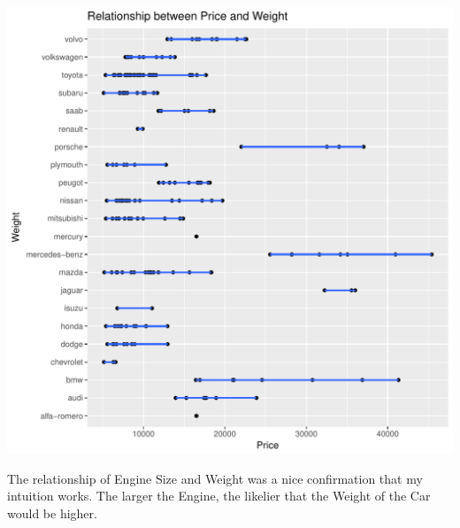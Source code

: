 \documentclass{article}\usepackage[]{graphicx}\usepackage[]{color}
\makeatletter
\def\maxwidth{ %
  \ifdim\Gin@nat@width>\linewidth
    \linewidth
  \else
    \Gin@nat@width
  \fi
}
\newenvironment{kframe}{%
 \def\at@end@of@kframe{}%
 \ifinner\ifhmode%
  \def\at@end@of@kframe{\end{minipage}}%
  \begin{minipage}{\columnwidth}%
 \fi\fi%
 \def\FrameCommand##1{\hskip\@totalleftmargin \hskip-\fboxsep
 \colorbox{shadecolor}{##1}\hskip-\fboxsep
     \hskip-\linewidth \hskip-\@totalleftmargin \hskip\columnwidth}%
 \MakeFramed {\advance\hsize-\width
   \@totalleftmargin\z@ \linewidth\hsize
   \@setminipage}}%
 {\par\unskip\endMakeFramed%
 \at@end@of@kframe}
\newenvironment{knitrout}{}{} %
\makeatother
\begin{document}
\begin{knitrout}
\begin{kframe}
{\ttfamily\noindent\color{warningcolor}{\#\# Warning: Removed 4 rows containing missing values (geom\_point).}}\end{kframe}
\includegraphics[width=\maxwidth]{figure/unnamed-chunk-1-2} 

\end{knitrout}

The relationship of Engine Size and Weight was a nice confirmation that my intuition works. The larger the Engine, the likelier that the Weight of the Car would be higher.
\end{document}
